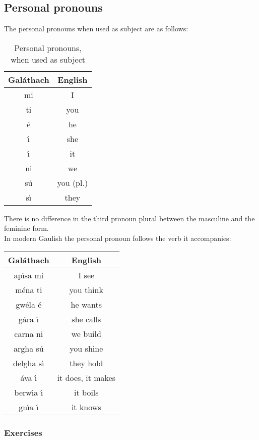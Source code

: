\subsection{Personal pronouns}

The personal pronouns when used as subject are as follows:
\begin{table}[H]
\centering
\begin{tabu}{c|c}
  \textbf{Gal\'{a}thach} & \textbf{English}\\
  \toprule
  mi & I \\
  ti & you\\
  \'{e} & he\\
  \'{\i} & she\\
  \'{\i} & it\\
  ni & we\\
  s\'{u} & you (pl.)\\
  s\'{\i} & they\\
\end{tabu}
\caption{Personal pronouns, when used as subject}
\label{personal_pronouns_as_subject}
\end{table}

There is no difference in the third pronoun plural between the masculine and the feminine form.\\

In modern Gaulish the personal pronoun follows the verb it accompanies:
\begin{table}[H]
\centering
\begin{tabu}{c|c}
  \textbf{Gal\'{a}thach} & \textbf{English}\\
  \toprule
  ap\'{\i}sa mi & I see\\
  m\'{e}na ti & you think\\
  gw\'{e}la \'{e} & he wants\\
  g\'{a}ra \'{\i} & she calls\\
  carna ni & we build\\
  argha s\'{u} & you shine\\
  delgha s\'{\i} & they hold\\
  \'{a}va \'{\i} & it  does, it makes\\
  berw\'{\i}a \'{\i} & it boils\\
  gn\'{\i}a \'{\i} & it knows\\
\end{tabu}
\label{examples_personal_pronoun}
\end{table}

\newpage
\subsubsection{Exercises}

